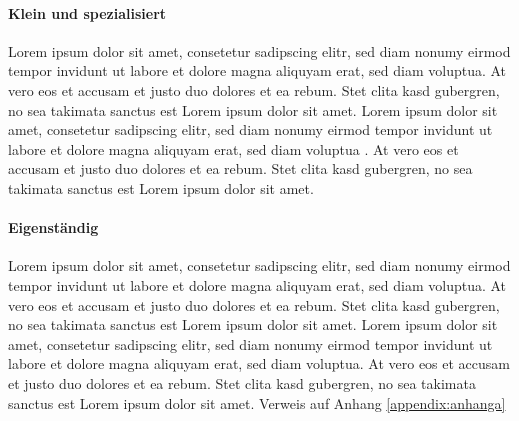 \paragraph{Klein und spezialisiert} Lorem ipsum dolor sit amet, consetetur sadipscing elitr, sed
diam nonumy eirmod tempor invidunt ut labore et dolore magna aliquyam erat, sed diam voluptua. At
vero eos et accusam et justo duo dolores et ea rebum. Stet clita kasd gubergren, no sea takimata
sanctus est Lorem ipsum dolor sit amet. Lorem ipsum dolor sit amet, consetetur sadipscing elitr,
sed diam nonumy eirmod tempor invidunt ut labore et dolore magna aliquyam erat, sed diam voluptua
. At vero eos et accusam et justo duo dolores et ea rebum. Stet clita kasd gubergren, no sea
takimata sanctus est Lorem ipsum dolor sit amet.

\paragraph{Eigenständig} Lorem ipsum dolor sit amet, consetetur sadipscing elitr, sed diam nonumy
eirmod tempor invidunt ut labore et dolore magna aliquyam erat, sed diam voluptua. At vero eos et
accusam et justo duo dolores et ea rebum. Stet clita kasd gubergren, no sea takimata sanctus est
Lorem ipsum dolor sit amet. Lorem ipsum dolor sit amet, consetetur sadipscing elitr, sed diam
nonumy eirmod tempor invidunt ut labore et dolore magna aliquyam erat, sed diam voluptua. At vero
eos et accusam et justo duo dolores et ea rebum. Stet clita kasd gubergren, no sea takimata
sanctus est Lorem ipsum dolor sit amet. Verweis auf Anhang \ref{appendix:anhanga}
